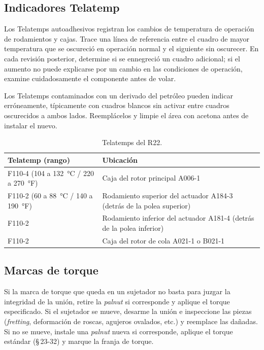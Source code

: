 \subsection{Indicadores Telatemp}

Los Telatemps autoadhesivos registran los cambios de temperatura de operación de rodamientos y cajas. Trace una línea de referencia entre el cuadro de mayor temperatura que se oscureció en operación normal y el siguiente sin oscurecer. En cada revisión posterior, determine si se ennegreció un cuadro adicional; si el aumento no puede explicarse por un cambio en las condiciones de operación, examine cuidadosamente el componente antes de volar.

\begin{nota}
Los Telatemps contaminados con un derivado del petróleo pueden indicar erróneamente, típicamente con cuadros blancos sin activar entre cuadros oscurecidos a ambos lados. Reemplácelos y limpie el área con acetona antes de instalar el nuevo.
\end{nota}

\begin{table}[htbp]
\centering\small
\caption{Telatemps del R22.}
\begin{tabularx}{\linewidth}{@{}lY@{}}
\toprule
Telatemp (rango) & Ubicación \\
\midrule
F110-4 (104 a 132~°C / 220 a 270~°F) & Caja del rotor principal A006-1 \\
F110-2 (60 a 88~°C / 140 a 190~°F) & Rodamiento superior del actuador A184-3 (detrás de la polea superior) \\
F110-2 & Rodamiento inferior del actuador A181-4 (detrás de la polea inferior) \\
F110-2 & Caja del rotor de cola A021-1 o B021-1 \\
\bottomrule
\end{tabularx}
\end{table}

\subsection{Marcas de torque}

Si la marca de torque que queda en un sujetador no basta para juzgar la integridad de la unión, retire la \emph{palnut} si corresponde y aplique el torque especificado. Si el sujetador se mueve, desarme la unión e inspeccione las piezas (\emph{fretting}, deformación de roscas, agujeros ovalados, etc.) y reemplace las dañadas. Si no se mueve, instale una \emph{palnut} nueva si corresponde, aplique el torque estándar (\S\,23-32) y marque la franja de torque.

